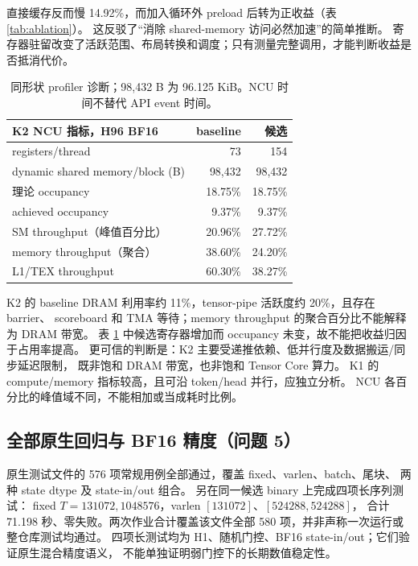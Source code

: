 \documentclass[11pt,a4paper,fontset=none]{ctexart}
\begin{document}
直接缓存反而慢 14.92\%，而加入循环外 preload 后转为正收益（表 \ref{tab:ablation}）。
这反驳了“消除 shared-memory 访问必然加速”的简单推断。
寄存器驻留改变了活跃范围、布局转换和调度；只有测量完整调用，才能判断收益是否抵消代价。

\begin{table}[htbp]\centering\small
\begin{tabular}{lrr}\toprule
K2 NCU 指标，H96 BF16&baseline&候选\\\midrule
registers/thread&73&154\\
dynamic shared memory/block (B)&98,432&98,432\\
理论 occupancy&18.75\%&18.75\%\\
achieved occupancy&9.37\%&9.37\%\\
SM throughput（峰值百分比）&20.96\%&27.72\%\\
memory throughput（聚合）&38.60\%&24.20\%\\
L1/TEX throughput&60.30\%&38.27\%\\\bottomrule
\end{tabular}
\caption{同形状 profiler 诊断；98,432 B 为 96.125 KiB。NCU 时间不替代 API event 时间。}
\label{tab:ncu}
\end{table}

K2 的 baseline DRAM 利用率约 11\%，tensor-pipe 活跃度约 20\%，且存在 barrier、
scoreboard 和 TMA 等待；memory throughput 的聚合百分比不能解释为 DRAM 带宽。
表 \ref{tab:ncu} 中候选寄存器增加而 occupancy 未变，故不能把收益归因于占用率提高。
更可信的判断是：K2 主要受递推依赖、低并行度及数据搬运/同步延迟限制，
既非饱和 DRAM 带宽，也非饱和 Tensor Core 算力。
K1 的 compute/memory 指标较高，且可沿 token/head 并行，应独立分析。
NCU 各百分比的峰值域不同，不能相加或当成耗时比例\cite{ncu}。

\subsection{全部原生回归与 BF16 精度（问题 5）}
原生测试文件的 576 项常规用例全部通过，覆盖 fixed、varlen、batch、尾块、
两种 state dtype 及 state-in/out 组合。
另在同一候选 binary 上完成四项长序列测试：
fixed \(T=131072,1048576\)，varlen \([131072]\)、\([524288,524288]\)，
合计 71.198 秒、零失败。两次作业合计覆盖该文件全部 580 项，并非声称一次运行或整仓库测试均通过。
四项长测试均为 H1、随机门控、BF16 state-in/out；它们验证原生混合精度语义，
不能单独证明弱门控下的长期数值稳定性。
\end{document}
